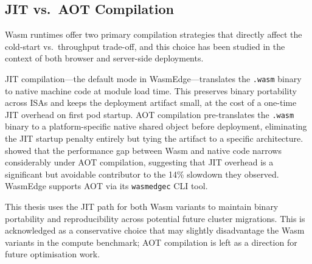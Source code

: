 \subsection{JIT vs.\ AOT Compilation}
\label{sec:jit_vs_aot}

\acs{Wasm} runtimes offer two primary compilation strategies that directly affect the cold-start vs.\ throughput trade-off, and this choice has been studied in the context of both browser and server-side deployments.

\ac{JIT} compilation---the default mode in \acs{WasmEdge}---translates the \texttt{.wasm} binary to native machine code at module load time. This preserves binary portability across \acs{ISA}s and keeps the deployment artifact small, at the cost of a one-time JIT overhead on first pod startup. \ac{AOT} compilation pre-translates the \texttt{.wasm} binary to a platform-specific native shared object before deployment, eliminating the JIT startup penalty entirely but tying the artifact to a specific architecture. \textcite{spies2021evaluation} showed that the performance gap between \acs{Wasm} and native code narrows considerably under \acs{AOT} compilation, suggesting that JIT overhead is a significant but avoidable contributor to the 14\% slowdown they observed. \acs{WasmEdge} supports \acs{AOT} via its \texttt{wasmedgec} \acs{CLI} tool.

This thesis uses the \acs{JIT} path for both \acs{Wasm} variants to maintain binary portability and reproducibility across potential future cluster migrations. This is acknowledged as a conservative choice that may slightly disadvantage the \acs{Wasm} variants in the compute benchmark; \acs{AOT} compilation is left as a direction for future optimisation work.
